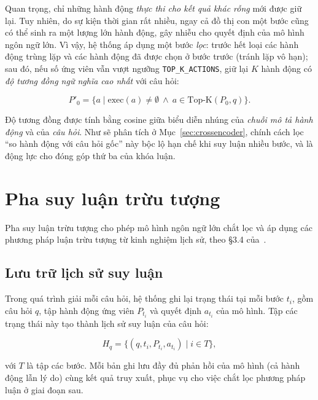 Quan trọng, chỉ những hành động \emph{thực thi cho kết quả khác rỗng} mới được giữ lại. Tuy nhiên,
do sự kiện thời gian rất nhiều, ngay cả đồ thị con một bước cũng có thể sinh ra một lượng lớn hành
động, gây nhiễu cho quyết định của mô hình ngôn ngữ lớn. Vì vậy, hệ thống áp dụng một bước
\emph{lọc}: trước hết loại các hành động trùng lặp và các hành động đã được chọn ở bước trước (tránh
lặp vô hạn); sau đó, nếu số ứng viên vẫn vượt ngưỡng \texttt{TOP\_K\_ACTIONS}, giữ lại $K$ hành động
có \emph{độ tương đồng ngữ nghĩa cao nhất} với câu hỏi:

\begin{equation}
\label{eq:filter}
P'_0 = \{a \mid \mathrm{exec}(a) \neq \emptyset \ \wedge\ a \in \mathrm{Top\text{-}K}(P_0, q)\}.
\end{equation}

Độ tương đồng được tính bằng cosine giữa biểu diễn nhúng của \emph{chuỗi mô tả hành động} và của
\emph{câu hỏi}. Như sẽ phân tích ở Mục~\ref{sec:crossencoder}, chính cách lọc ``so hành động với
câu hỏi gốc'' này bộc lộ hạn chế khi suy luận nhiều bước, và là động lực cho đóng góp thứ ba của
khóa luận.

\section{Pha suy luận trừu tượng}
\label{sec:knowledge-agnostic}

Pha suy luận trừu tượng cho phép mô hình ngôn ngữ lớn chắt lọc và áp dụng các phương pháp luận trừu
tượng từ kinh nghiệm lịch sử, theo §3.4 của~\cite{chen2024ari}.

\subsection{Lưu trữ lịch sử suy luận}
\label{sec:history}

Trong quá trình giải mỗi câu hỏi, hệ thống ghi lại trạng thái tại mỗi bước $t_i$, gồm câu hỏi $q$,
tập hành động ứng viên $P_{t_i}$ và quyết định $a_{t_i}$ của mô hình. Tập các trạng thái này tạo
thành lịch sử suy luận của câu hỏi:

\begin{equation}
\label{eq:history}
H_q = \{(q, t_i, P_{t_i}, a_{t_i}) \mid i \in T\},
\end{equation}

với $T$ là tập các bước. Mỗi bản ghi lưu đầy đủ phản hồi của mô hình (cả hành động lẫn lý do) cùng
kết quả truy xuất, phục vụ cho việc chắt lọc phương pháp luận ở giai đoạn sau.

